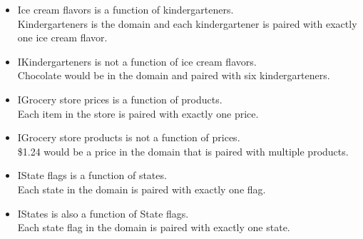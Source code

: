 \documentclass{ximera}
\begin{document}
\begin{example}

\begin{itemize}
\item Ice cream flavors is a function of kindergarteners. \\
Kindergarteners is the domain and each kindergartener is paired with exactly one ice cream flavor.

\item IKindergarteners is not a function of ice cream flavors. \\
Chocolate would be in the domain and paired with six kindergarteners.

\item IGrocery store prices is a function of products.\\
Each item in the store is paired with exactly one price.

\item IGrocery store products is not a function of prices.\\
\$1.24 would be a price in the domain that is paired with multiple products.

\item IState flags is a function of states.\\
Each state in the domain is paired with exactly one flag.

\item IStates is also a function of State flags.\\
Each state flag in the domain is paired with exactly one state.
\end{itemize}

\end{example}
\end{document}
